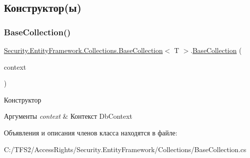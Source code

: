 \subsection{Конструктор(ы)}
\mbox{\label{class_security_1_1_entity_framework_1_1_collections_1_1_base_collection_adbdfc06a507416ccb21ef4504032b8b9}} 
\subsubsection{\texorpdfstring{Base\+Collection()}{BaseCollection()}}
{\footnotesize\ttfamily \hyperlink{class_security_1_1_entity_framework_1_1_collections_1_1_base_collection}{Security.\+Entity\+Framework.\+Collections.\+Base\+Collection}$<$ T $>$.\hyperlink{class_security_1_1_entity_framework_1_1_collections_1_1_base_collection}{Base\+Collection} (\begin{DoxyParamCaption}\item[{\hyperlink{class_security_1_1_entity_dal_1_1_security_context}{Security\+Context}}]{context }\end{DoxyParamCaption})\hspace{0.3cm}{\ttfamily [protected]}}



Конструктор 


\begin{DoxyParams}{Аргументы}
{\em context} & Контекст Db\+Context\\
\hline
\end{DoxyParams}


Объявления и описания членов класса находятся в файле\+:\begin{DoxyCompactItemize}
\item 
C\+:/\+T\+F\+S2/\+Access\+Rights/\+Security.\+Entity\+Framework/\+Collections/Base\+Collection.\+cs\end{DoxyCompactItemize}
